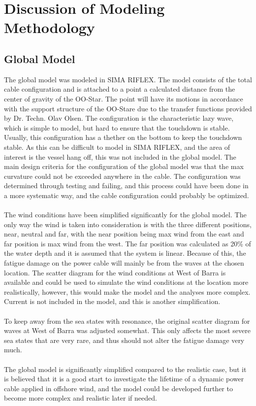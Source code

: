 \section{Discussion of Modeling Methodology}
\subsection{Global Model}
 The global model was modeled in SIMA RIFLEX. The model consists of the total cable configuration and is attached to a point a calculated distance from the center of gravity of the OO-Star. The point will have its motions in accordance with the support structure of the OO-Stare due to the transfer functions provided by Dr. Techn. Olav Olsen. The configuration is the characteristic lazy wave, which is simple to model, but hard to ensure that the touchdown is stable. Usually, this configuration has a thether on the bottom to keep the touchdown stable. As this can be difficult to model in SIMA RIFLEX, and the area of interest is the vessel hang off, this was not included in the global model. The main design criteria for the configuration of the global model was that the max curvature could not be exceeded anywhere in the cable. The configuration was determined through testing and failing, and this process could have been done in a more systematic way, and the cable configuration could probably be optimized. \\\\ The wind conditions have been simplified significantly for the global model. The only way the wind is taken into consideration is with the three different positions, near, neutral and far, with the near position being max wind from the east and far position is max wind from the west. The far position was calculated as 20\% of the water depth and it is assumed that the system is linear. Because of this, the fatigue damage on the power cable will mainly be from the waves at the chosen location. The scatter diagram for the wind conditions at West of Barra is available and could be used to simulate the wind conditions at the location more realistically, however, this would make the model and the analyses more complex. Current is not included in the model, and this is another simplification.\\\\ To keep away from the sea states with resonance, the original scatter diagram for waves at West of Barra was adjusted somewhat. This only affects the most severe sea states that are very rare, and thus should not alter the fatigue damage very much.\\\\ The global model is significantly simplified compared to the realistic case, but it is believed that it is a good start to investigate the lifetime of a dynamic power cable applied in offshore wind, and the model could be developed further to become more complex and realistic later if needed. 
 
